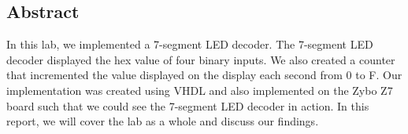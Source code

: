 \documentclass[10pt, letterpaper, titlepage]{article} %
\title{\textbf{\Huge{
\begin{center}
Introduction to Assembly Language\\
\end{center}
}}}
\author{Benjamin Kong\\Lora Ma\\ \\ECE 212 Lab Section H11}
\begin{document}
 
\maketitle

\begin{multicols*}{2}

\section{Abstract}

In this lab, we implemented a 7-segment LED decoder. 
The 7-segment LED decoder displayed the hex value of four binary inputs. 
We also created a counter that incremented the value displayed on the display each second from 0 to F. 
Our implementation was created using VHDL and also implemented on the Zybo Z7 board such that we could see the 7-segment LED decoder in action. 
In this report, we will cover the lab as a whole and discuss our findings.

\end{multicols*}
\end{document}
